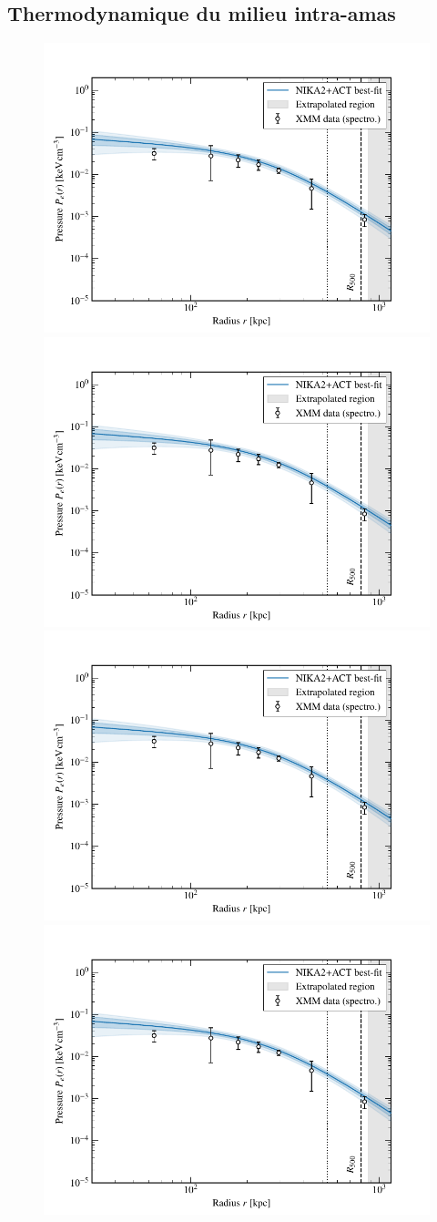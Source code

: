 \subsection{Thermodynamique du milieu intra-amas}

\begin{figure}[t]
    \centering
    \includegraphics[page=1, width=.485\linewidth, trim={.3cm .1cm .9cm .8cm}, clip]{Figures/Chap_actj0215/ICM_thermodynamics.pdf}
    \includegraphics[page=2, width=.485\linewidth, trim={.3cm .1cm .9cm .8cm}, clip]{Figures/Chap_actj0215/ICM_thermodynamics.pdf}
    \includegraphics[page=3, width=.485\linewidth, trim={.3cm .1cm .9cm .8cm}, clip]{Figures/Chap_actj0215/ICM_thermodynamics.pdf}
    \includegraphics[page=4, width=.485\linewidth, trim={.3cm .1cm .9cm .8cm}, clip]{Figures/Chap_actj0215/ICM_thermodynamics.pdf}

\end{figure}
